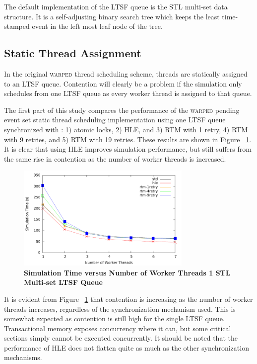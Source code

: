 \documentclass[11pt]{book}
\begin{document}
The default implementation of the LTSF queue is the STL multi-set data
structure.  It is a self-adjusting binary search tree which keeps the least
time-stamped event in the left most leaf node of the tree.

\subsection{Static Thread Assignment}

In the original \textsc{warped} thread scheduling scheme, threads are
statically assigned to an LTSF queue.  Contention will clearly be a problem if
the simulation only schedules from one LTSF queue as every worker thread is
assigned to that queue.

The first part of this study compares the performance of the \textsc{warped}
pending event set static thread scheduling implementation using one LTSF queue
synchronized with : 1) atomic locks, 2) HLE, and 3) RTM with 1 retry, 4) RTM
with 9 retries, and 5) RTM with 19 retries.  These results are shown in Figure
~\ref{fig:noThrMig_timeVSthreads_1schq}.  It is clear that using HLE improves
simulation performance, but still suffers from the same rise in contention as
the number of worker threads is increased.

\begin{figure}[H]
    \centering
    \graphicspath{ {./figures/} }
    \includegraphics[width=0.75\textwidth,keepaspectratio]{hugeepidemicsim-NOmig-timeVSthreads-multiset-1schQ}
    \caption{\textbf{Simulation Time versus Number of Worker Threads 1 STL Multi-set LTSF Queue}}
    \label{fig:noThrMig_timeVSthreads_1schq}
\end{figure}

It is evident from Figure ~\ref{fig:noThrMig_timeVSthreads_1schq} that
contention is increasing as the number of worker threads increases, regardless
of the synchronization mechanism used.  This is somewhat expected as contention
is still high for the single LTSF queue.  Transactional memory exposes
concurrency where it can, but some critical sections simply cannot be executed
concurrently.  It should be noted that the performance of HLE does not flatten
quite as much as the other synchronization mechanisms.
\end{document}
